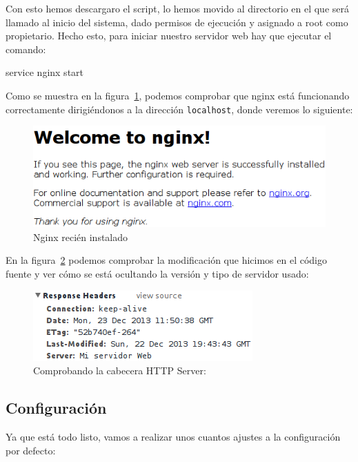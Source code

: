 Con esto hemos descargaro el script, lo hemos movido al directorio en el que será
llamado al inicio del sistema, dado permisos de ejecución y asignado a root como
propietario. Hecho esto, para iniciar nuestro servidor web hay que ejecutar
el comando:
\begin{bashcode}
service nginx start
\end{bashcode}
Como se muestra en la figura~\ref{nginx1}, podemos comprobar que nginx está
funcionando correctamente dirigiéndonos a la dirección \verb!localhost!,
donde veremos lo siguiente:
\begin{figure}[H]
\centering
\includegraphics[scale=.5]{./img/instalacionNginx.png}
\caption{Nginx recién instalado}
\label{nginx1}
\end{figure}

En la figura~\ref{serverheader} podemos comprobar la modificación que
hicimos en el código fuente y ver cómo se está ocultando la versión y
tipo de servidor usado:
\begin{figure}[H]
\centering
\includegraphics[scale=.5]{./img/serverHeader.png}
\caption{Comprobando la cabecera HTTP Server:}
\label{serverheader}
\end{figure}

\subsection{Configuración}

Ya que está todo listo, vamos a realizar unos cuantos ajustes a la configuración
por defecto:

